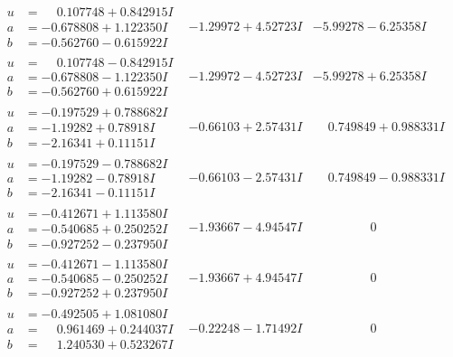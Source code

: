 \documentclass[1p]{elsarticle_modified}
\theoremstyle{definition}
\begin{document}
$$\begin{array}{c|c|c}
\begin{aligned}
u &= \phantom{-}0.107748 + 0.842915 I \\
a &= -0.678808 + 1.122350 I \\
b &= -0.562760 - 0.615922 I\end{aligned}
 & -1.29972 + 4.52723 I & -5.99278 - 6.25358 I \\ \hline\begin{aligned}
u &= \phantom{-}0.107748 - 0.842915 I \\
a &= -0.678808 - 1.122350 I \\
b &= -0.562760 + 0.615922 I\end{aligned}
 & -1.29972 - 4.52723 I & -5.99278 + 6.25358 I \\ \hline\begin{aligned}
u &= -0.197529 + 0.788682 I \\
a &= -1.19282 + 0.78918 I \\
b &= -2.16341 + 0.11151 I\end{aligned}
 & -0.66103 + 2.57431 I & \phantom{-}0.749849 + 0.988331 I \\ \hline\begin{aligned}
u &= -0.197529 - 0.788682 I \\
a &= -1.19282 - 0.78918 I \\
b &= -2.16341 - 0.11151 I\end{aligned}
 & -0.66103 - 2.57431 I & \phantom{-}0.749849 - 0.988331 I \\ \hline\begin{aligned}
u &= -0.412671 + 1.113580 I \\
a &= -0.540685 + 0.250252 I \\
b &= -0.927252 - 0.237950 I\end{aligned}
 & -1.93667 - 4.94547 I & \phantom{-0.000000 } 0 \\ \hline\begin{aligned}
u &= -0.412671 - 1.113580 I \\
a &= -0.540685 - 0.250252 I \\
b &= -0.927252 + 0.237950 I\end{aligned}
 & -1.93667 + 4.94547 I & \phantom{-0.000000 } 0 \\ \hline\begin{aligned}
u &= -0.492505 + 1.081080 I \\
a &= \phantom{-}0.961469 + 0.244037 I \\
b &= \phantom{-}1.240530 + 0.523267 I\end{aligned}
 & -0.22248 - 1.71492 I & \phantom{-0.000000 } 0 \\ \hline\begin{aligned}

\end{aligned}
\end{array}$$
\end{document}
